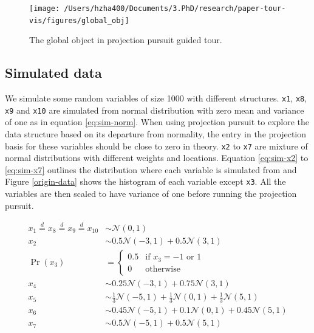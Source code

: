 \documentclass[12pt]{article}
\begin{document}
\begin{figure}
\texttt{[image: /Users/hzha400/Documents/3.PhD/research/paper-tour-vis/figures/global\_obj]} \caption{\label{glb-obj}The global object in projection pursuit guided tour.}\label{fig:glb-obj}
\end{figure}

\hypertarget{simulated-data}{%
\subsection{Simulated data}\label{simulated-data}}

We simulate some random variables of size 1000 with different
structures. \texttt{x1}, \texttt{x8}, \texttt{x9} and \texttt{x10} are
simulated from normal distribution with zero mean and variance of one as
in equation \ref{eq:sim-norm}. When using projection pursuit to explore
the data structure based on its departure from normality, the entry in
the projection basis for these variables should be close to zero in
theory. \texttt{x2} to \texttt{x7} are mixture of normal distributions
with different weights and locations. Equation \ref{eq:sim-x2} to
\ref{eq:sim-x7} outlines the distribution where each variable is
simulated from and Figure \ref{origin-data} shows the histogram of each
variable except \texttt{x3}. All the variables are then scaled to have
variance of one before running the projection pursuit.

\begin{align}
x_1 \overset{d}{=} x_8 \overset{d}{=} x_9 \overset{d}{=} x_{10}& \sim \mathcal{N}(0, 1) \label{eq:sim-norm} \\
x_2 &\sim 0.5 \mathcal{N}(-3, 1) + 0.5 \mathcal{N}(3, 1)\label{eq:sim-x2}\\
\Pr(x_3) &= 
\begin{cases}
0.5 & \text{if $x_3 = -1$ or $1$}\\
0 & \text{otherwise}
\end{cases}\label{eq:sim-x3}\\
x_4 &\sim 0.25 \mathcal{N}(-3, 1) + 0.75 \mathcal{N}(3, 1) \label{eq:sim-x4}\\
x_5 &\sim \frac{1}{3} \mathcal{N}(-5, 1) + \frac{1}{3} \mathcal{N}(0, 1) + \frac{1}{3} \mathcal{N}(5, 1)\label{eq:sim-x5}\\
x_6 &\sim 0.45 \mathcal{N}(-5, 1) + 0.1 \mathcal{N}(0, 1) + 0.45 \mathcal{N}(5, 1)\label{eq:sim-x6}\\
x_7 &\sim 0.5 \mathcal{N}(-5, 1) + 0.5 \mathcal{N}(5, 1) 
\label{eq:sim-x7}
\end{align}
\end{document}
